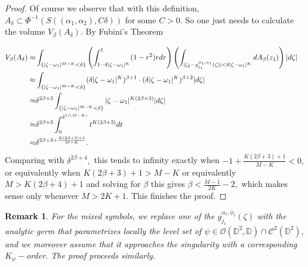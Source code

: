 \documentclass[12pt]{amsart}
\newtheorem{remark}[theorem]{Remark}
\numberwithin{equation}{section}
\begin{document}
\begin{proof}
Of course we observe that with this definition, $A_{\delta}\subset \Phi^{-1}(S((\alpha_1,\alpha_2),C\delta))$ for some $C>0.$ So one just needs to calculate the volume $V_{\beta}(A_{\delta}).$ By Fubini's Theorem

\begin{align} V_{\beta}(A_{\delta})\approx&\int_{\{
|\zeta-\omega_1|^{M-K}<\delta\}} \left(\int_{1-\delta|\zeta-\omega_1|^K}^{1}(1-r^2)rdr\right)\left(\int_{|\zeta_2-g_{j_1}^{\phi_1,\alpha_1}(\zeta)|<\delta |\zeta-\omega_1|^{K}}dA_{\beta}(z_1)\right)|d\zeta|\notag&&\\
\approx& \int_{\{
|\zeta-\omega_1|^{M-K}<\delta\}}(\delta|\zeta-\omega_1|^{K})^{\beta+1}\cdot(\delta|\zeta-\omega_1|^K)^{\beta+2}|d\zeta|\notag&&\\
\approx&\delta^{2\beta+3}\int_{\{
|\zeta-\omega_1|^{M-K}<\delta\}}|\zeta-\omega_1|^{K(2\beta+3)}|d\zeta|\notag&&\\
\approx&\delta^{2\beta+3}\int_{0}^{\delta^{1/(M-K)}}t^{K(2\beta+3)}dt\notag&&\\
\approx&\delta^{2\beta+3+\frac{K(2\beta+3)+1}{M-K}}.
\end{align}
Comparing with $\delta^{2\beta+4},$ this tends to infinity exactly when $-1+\frac{K(2\beta+3)+1}{M-K}<0,$ or equivalently when $K(2\beta+3)+1>M-K$ or equivalently $M>K(2\beta+4)+1$ and solving for $\beta$ this gives $\beta<\frac{M-1}{2K}-2,$ which makes sense only whenever $M>2K+1.$ This finishes the proof.
\end{proof}
\begin{remark} For the mixed symbols, we replace one of the $g^{\alpha_\ell,\phi_\ell}_{j_\ell}(\zeta)$ with the analytic germ that parametrizes locally the level set of $\psi\in \mathcal{O}(\mathbb{D}^2,\mathbb{D})\cap\mathcal{C}^2(\mathbb{D}^2),$ and we moreover assume that it approaches the singularity with a corresponding $K_{\psi}-$order. The proof proceeds similarly.
\end{remark}
\end{document}
